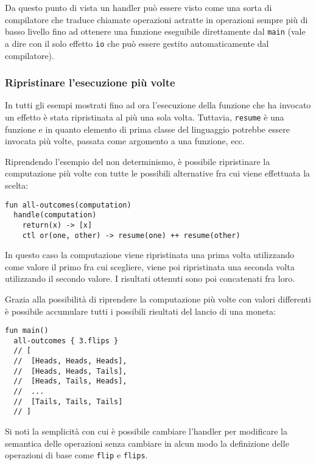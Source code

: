 Da questo punto di vista un handler può essere visto come una sorta di compilatore che traduce chiamate operazioni astratte in operazioni sempre più di basso livello fino ad ottenere una funzione eseguibile direttamente dal \lstinline{main} (vale a dire con il solo effetto \lstinline{io} che può essere gestito automaticamente dal compilatore).

\subsubsection{Ripristinare l'esecuzione più volte}
In tutti gli esempi mostrati fino ad ora l'esecuzione della funzione che ha invocato un effetto è stata ripristinata al più una sola volta.
Tuttavia, \lstinline{resume} è una funzione e in quanto elemento di prima classe del linguaggio potrebbe essere invocata più volte, passata come argomento a una funzione, ecc.

Riprendendo l'esempio del non determinismo, è possibile ripristinare la computazione più volte con tutte le possibili alternative fra cui viene effettuata la scelta:
\begin{lstlisting}[language=koka]
fun all-outcomes(computation)
  handle(computation)
    return(x) -> [x]
    ctl or(one, other) -> resume(one) ++ resume(other)
\end{lstlisting}
In questo caso la computazione viene ripristinata una prima volta utilizzando come valore il primo fra cui scegliere, viene poi ripristinata una seconda volta utilizzando il secondo valore. I risultati ottenuti sono poi concatenati fra loro.

Grazia alla possibilità di riprendere la computazione più volte con valori differenti è possibile accumulare tutti i possibili risultati del lancio di una moneta:
\begin{lstlisting}[language=koka]
fun main()
  all-outcomes { 3.flips }
  // [
  //  [Heads, Heads, Heads],
  //  [Heads, Heads, Tails],
  //  [Heads, Tails, Heads],
  //  ...
  //  [Tails, Tails, Tails]
  // ]
\end{lstlisting}

Si noti la semplicità con cui è possibile cambiare l'handler per modificare la semantica delle operazioni senza cambiare in alcun modo la definizione delle operazioni di base come \lstinline{flip} e \lstinline{flips}.
